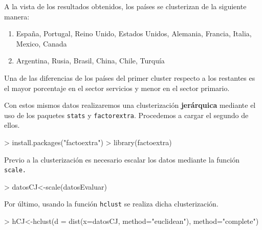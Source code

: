 \documentclass [a4paper] {article}
\begin{document}
\bigskip
A la vista de los resultados obtenidos, los países se clusterizan de la siguiente manera:
\begin{enumerate}
\item España, Portugal, Reino Unido, Estados Unidos, Alemania, Francia, Italia, Mexico, Canada
\item Argentina, Rusia, Brasil, China, Chile, Turquía
\end{enumerate}

Una de las diferencias de los países del primer cluster respecto a los restantes es el mayor 
porcentaje en el sector servicios y menor en el sector primario.

\bigskip
Con estos mismos datos realizaremos una clusterización \textbf{jerárquica} mediante el uso de los
paquetes \texttt{stats} y \texttt{factorextra}. Procedemos a cargar el segundo de ellos.
\begin{Schunk}
\begin{Sinput}
> install.packages("factoextra")
> library(factoextra)
\end{Sinput}
\end{Schunk}

\bigskip
Previo a la clusterización es necesario escalar los datos mediante la función \texttt{scale.}
\begin{Schunk}
\begin{Sinput}
> datosCJ<-scale(datosEvaluar)
\end{Sinput}
\end{Schunk}

\bigskip
Por último, usando la función \texttt{hclust} se realiza dicha clusterización.
\begin{Schunk}
\begin{Sinput}
> hCJ<-hclust(d = dist(x=datosCJ, method="euclidean"), method="complete")
\end{Sinput}
\end{Schunk}
\end{document}
